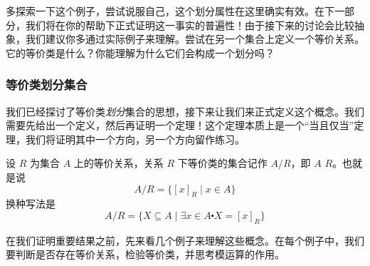 多探索一下这个例子，尝试说服自己，这个划分属性在这里确实有效。在下一部分，我们将在你的帮助下正式证明这一事实的普遍性！由于接下来的讨论会比较抽象，我们建议你多通过实际例子来理解。尝试在另一个集合上定义一个等价关系。它的等价类是什么？你能理解为什么它们会构成一个划分吗？

\subsubsection*{等价类划分集合}

我们已经探讨了等价类\emph{划分}集合的思想，接下来让我们来正式定义这个概念。我们需要先给出一个定义，然后再证明一个定理！这个定理本质上是一个``当且仅当''定理，我们将证明其中一个方向，另一个方向留作练习。

\begin{definition}
    设 $R$ 为集合 $A$ 上的等价关系，关系 $R$ 下等价类的集合记作 $A / R$，即 $A$  $R$。也就是说
    \[A / R = \{[x]_R \mid x \in A\}\]
    换种写法是
    \[A / R = \{X \subseteq A \mid \exists x \in A \centerdot X = [x]_R\}\]
\end{definition}

在我们证明重要结果之前，先来看几个例子来理解这些概念。在每个例子中，我们要判断是否存在等价关系，检验等价类，并思考模运算的作用。\\

